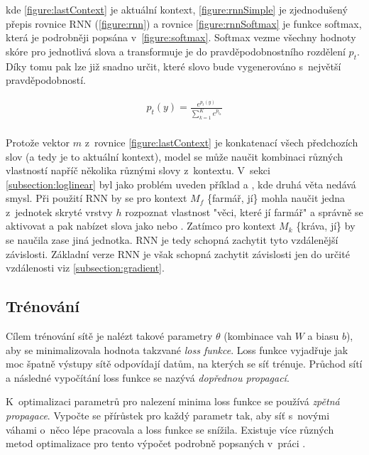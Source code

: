 kde \ref{figure:lastContext} je aktuální kontext, \ref{figure:rnnSimple} je zjednodušený přepis rovnice RNN (\ref{figure:rnn}) a rovnice \ref{figure:rnnSoftmax} je funkce softmax, která je podrobněji popsána v~\ref{figure:softmax}. Softmax vezme všechny hodnoty skóre pro jednotlivá slova a transformuje je do pravděpodobnostního rozdělení $p_t$. Díky tomu pak lze již snadno určit, které slovo bude vygenerováno s~největší pravděpodobností.


\begin{align}\label{figure:softmax}
  p_t(y)={\frac {e^{p_{t}(y)}}{\sum _{k=1}^{K}e^{p_{t_{k}}}}}
\end{align}
\\


Protože vektor $m$ z~rovnice \ref{figure:lastContext} je konkatenací všech předchozích slov (a tedy je to aktuální kontext), model se může naučit kombinaci různých vlastností napříč několika různými slovy z~kontextu. V~sekci \ref{subsection:loglinear} byl jako problém uveden příklad  a , kde druhá věta nedává smysl. Při použití RNN by se pro kontext $M_f$  \{farmář, jí\} mohla naučit jedna z~jednotek skryté vrstvy $h$ rozpoznat vlastnost "věci, které jí farmář" a správně se aktivovat a pak nabízet slova jako  nebo . Zatímco pro kontext $M_k$ \{kráva, jí\} by se naučila zase jiná jednotka. RNN je tedy schopná zachytit tyto vzdálenější závislosti. Základní verze RNN je však schopná zachytit závislosti jen do určité vzdálenosti viz \ref{subsection:gradient}.


\subsection{Trénování} \label{subsection:training}
Cílem trénování sítě je nalézt takové parametry $\theta$ (kombinace vah $W$ a biasu $b$), aby se minimalizovala hodnota takzvané \emph{loss funkce}. Loss funkce vyjadřuje jak moc špatně výstupy sítě odpovídají datům, na kterých se síť trénuje. Průchod sítí a následné vypočítání loss funkce se nazývá \emph{dopřednou propagací}.



K~optimalizaci parametrů pro nalezení minima loss funkce se používá \emph{zpětná propagace}. Vypočte se přírůstek pro každý parametr tak, aby síť s~novými váhami o~něco lépe pracovala a loss funkce se snížila. Existuje více různých metod optimalizace pro tento výpočet podrobně popsaných v~práci \cite{gradientDescent}.

